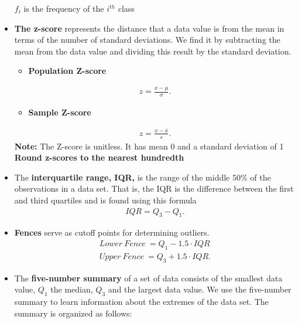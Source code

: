 \documentclass{report}
\begin{document}
\begin{itemize}
                $f_{i}$ is the frequency of the $i^{th}$ class
             \item \textbf{The z-score} represents the distance that a data value is from the mean in terms of the number of standard deviations. We find it by subtracting the mean from the data value and dividing this result by the standard deviation.
                 \begin{itemize}
                     \item \textbf{Population Z-score}
                 \end{itemize}
                 \begin{align*}
                      z = \frac{x - \mu}{\sigma}
                 .\end{align*}
                 \begin{itemize}
                     \item \textbf{Sample Z-score}
                 \end{itemize}
                 \begin{align*}
                     z =\frac{x-\overline{x}}{s}
                 .\end{align*}
                 \textbf{Note:} The Z-score is unitless. It has mean  0 and a standard deviation of 1 \\
                 \textbf{Round z-scores to the nearest hundredth}
                \item The \textbf{interquartile range, IQR,} is the range of the middle $50\% $  of the observations in a data set. That is, the IQR is the difference between the first and third quartiles and is found using this formula  
                    \begin{align*}
                        IQR = Q_{3} - Q_{1}
                    .\end{align*}
                \item \textbf{Fences} serve as cutoff points for determining outliers.
                    \begin{align*}
                        Lower\ Fence\ = Q_{1} - 1.5\cdot IQR \\
                        Upper\ Fence\ = Q_{3} + 1.5\cdot IQR
                    .\end{align*}
        \item The \textbf{five-number summary} of a set of data consists of the smallest data value, $Q_{1} $  the median, $Q_{3} $  and the largest data value. We use the five-number summary to learn information about the extremes of the data set. The summary is organized as follows:

\end{itemize}
\end{document}

